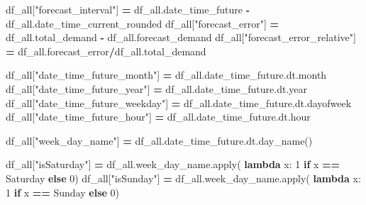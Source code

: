 \documentclass[mstat,12pt]{unswthesis}
\newenvironment{Shaded}{\begin{snugshade}}{\end{snugshade}}
\newcommand{\BuiltInTok}[1]{#1}
\newcommand{\ControlFlowTok}[1]{\textcolor[rgb]{0.13,0.29,0.53}{\textbf{#1}}}
\newcommand{\DecValTok}[1]{\textcolor[rgb]{0.00,0.00,0.81}{#1}}
\newcommand{\KeywordTok}[1]{\textcolor[rgb]{0.13,0.29,0.53}{\textbf{#1}}}
\newcommand{\NormalTok}[1]{#1}
\newcommand{\OperatorTok}[1]{\textcolor[rgb]{0.81,0.36,0.00}{\textbf{#1}}}
\newcommand{\StringTok}[1]{\textcolor[rgb]{0.31,0.60,0.02}{#1}}
\begin{document}
\begin{Shaded}
\begin{Highlighting}[]
\NormalTok{df\_all[}\StringTok{"forecast\_interval"}\NormalTok{] }\OperatorTok{=}\NormalTok{ df\_all.date\_time\_future }\OperatorTok{{-}} 
\NormalTok{    df\_all.date\_time\_current\_rounded}
\NormalTok{df\_all[}\StringTok{"forecast\_error"}\NormalTok{] }\OperatorTok{=}\NormalTok{ df\_all.total\_demand }\OperatorTok{{-}} 
\NormalTok{    df\_all.forecast\_demand}
\NormalTok{df\_all[}\StringTok{"forecast\_error\_relative"}\NormalTok{] }\OperatorTok{=} 
\NormalTok{    df\_all.forecast\_error}\OperatorTok{/}\NormalTok{df\_all.total\_demand}

\NormalTok{df\_all[}\StringTok{"date\_time\_future\_month"}\NormalTok{] }\OperatorTok{=}\NormalTok{ df\_all.date\_time\_future.dt.month}
\NormalTok{df\_all[}\StringTok{"date\_time\_future\_year"}\NormalTok{] }\OperatorTok{=}\NormalTok{ df\_all.date\_time\_future.dt.year}
\NormalTok{df\_all[}\StringTok{"date\_time\_future\_weekday"}\NormalTok{] }\OperatorTok{=}\NormalTok{ df\_all.date\_time\_future.dt.dayofweek}
\NormalTok{df\_all[}\StringTok{"date\_time\_future\_hour"}\NormalTok{] }\OperatorTok{=}\NormalTok{ df\_all.date\_time\_future.dt.hour}

\NormalTok{df\_all[}\StringTok{"week\_day\_name"}\NormalTok{] }\OperatorTok{=}\NormalTok{ df\_all.date\_time\_future.dt.day\_name()}

\NormalTok{df\_all[}\StringTok{"isSaturday"}\NormalTok{] }\OperatorTok{=}\NormalTok{ df\_all.week\_day\_name.}\BuiltInTok{apply}\NormalTok{(}
    \KeywordTok{lambda}\NormalTok{ x: }\DecValTok{1} \ControlFlowTok{if}\NormalTok{ x }\OperatorTok{==} \StringTok{\textquotesingle{}Saturday\textquotesingle{}} \ControlFlowTok{else} \DecValTok{0}\NormalTok{)}
\NormalTok{df\_all[}\StringTok{"isSunday"}\NormalTok{] }\OperatorTok{=}\NormalTok{ df\_all.week\_day\_name.}\BuiltInTok{apply}\NormalTok{(}
    \KeywordTok{lambda}\NormalTok{ x: }\DecValTok{1} \ControlFlowTok{if}\NormalTok{ x }\OperatorTok{==} \StringTok{\textquotesingle{}Sunday\textquotesingle{}} \ControlFlowTok{else} \DecValTok{0}\NormalTok{)}


\end{Highlighting}
\end{Shaded}
\end{document}
